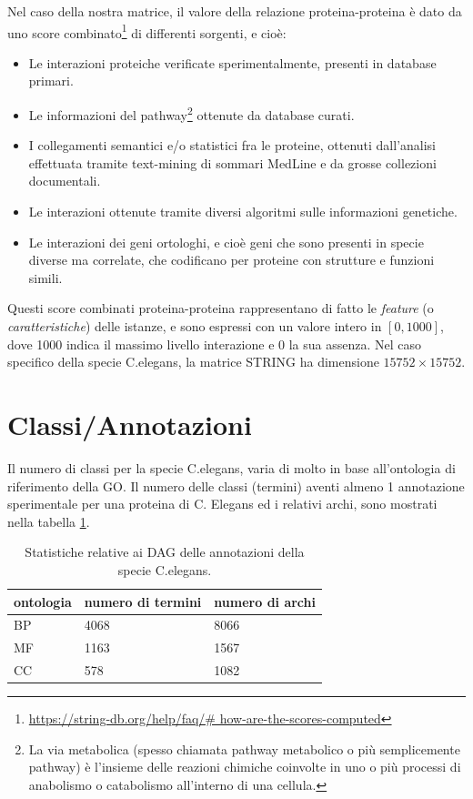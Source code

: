 \documentclass[12pt]{report}
\begin{document}
\newline
\newline
Nel caso della nostra matrice, il valore della relazione proteina-proteina è dato da uno score combinato\footnote{\footnotesize{\url{https://string-db.org/help/faq/\# how-are-the-scores-computed}}} di differenti sorgenti, e cioè:
\begin{itemize}
\item Le interazioni proteiche verificate sperimentalmente, presenti in database primari.
\item Le informazioni del pathway\footnote{\footnotesize{La via metabolica (spesso chiamata pathway metabolico o più semplicemente pathway) è l'insieme delle reazioni chimiche coinvolte in uno o più processi di anabolismo o catabolismo all'interno di una cellula.}} ottenute da database curati. 
\item I collegamenti semantici e/o statistici fra le proteine, ottenuti dall'analisi effettuata tramite text-mining di sommari MedLine e da grosse collezioni documentali. 
\item Le interazioni ottenute tramite diversi algoritmi sulle informazioni genetiche.
\item Le interazioni dei geni ortologhi, e cioè geni che sono presenti in specie diverse ma correlate, che codificano per proteine con strutture e funzioni simili.
\end{itemize} 

Questi score combinati proteina-proteina rappresentano di fatto le \emph{feature} (o \emph{caratteristiche}) delle istanze, e sono espressi con un valore intero in $[0, 1000]$, dove 1000 indica il massimo livello interazione e 0 la sua assenza. 
\newline
\newline
Nel caso specifico della specie C.elegans, la matrice STRING ha dimensione $15752 \times 15752$. 
\section{Classi/Annotazioni}
Il numero di classi per la specie C.elegans, varia di molto in base all'ontologia di riferimento della GO. Il numero delle classi (termini) aventi almeno 1 annotazione sperimentale per una proteina di C. Elegans ed i relativi archi, sono mostrati nella tabella \ref{DAG_desc}.

\begin{table}[h]
\centering
\begin{tabular}{|l|l|l|}
\hline
       ontologia & numero di termini & numero di archi \\ \hline
BP & 4068  &  8066   \\ 
\hline
MF  & 1163  & 1567   \\ 
\hline
CC  & 578  & 1082     \\ 
\hline
\end{tabular}
\caption{\footnotesize{Statistiche relative ai DAG delle annotazioni della specie C.elegans.}}
\label{DAG_desc}
\end{table}
\end{document}
